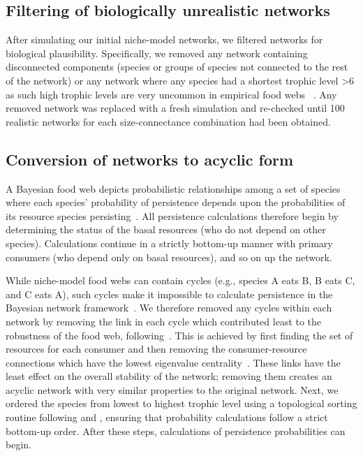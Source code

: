 \documentclass[12pt]{article}
\begin{document}
\begin{spacing}{2.0}
    
    \subsection*{Filtering of biologically unrealistic networks}

        After simulating our initial niche-model networks, we filtered networks for biological plausibility.
        Specifically, we removed any network containing disconnected components
        (species or groups of species not connected to the rest of the network) 
        or any network where any species had a shortest trophic level \textgreater6 as such high trophic levels are very uncommon in empirical food webs ~\citep{Riede2011}.
        Any removed network was replaced with a fresh simulation and re-checked until 100 realistic networks for each size-connectance combination had been obtained.
    

    \subsection*{Conversion of networks to acyclic form}

        A Bayesian food web depicts probabilistic relationships among a set of species where each species' probability of persistence depends upon the probabilities of its resource species persisting~\citep{Jensen_Nielsen,Eklof2013}. 
        All persistence calculations therefore begin by determining the status of the basal resources (who do not depend on other species).
        Calculations continue in a strictly bottom-up manner with primary consumers (who depend only on basal resources), and so on up the network.

            
        While niche-model food webs can contain cycles (e.g., species A eats B, B eats C, and C eats A), such cycles make it impossible to calculate persistence in the Bayesian network framework~\citep{Tarjan1972}. 
        We therefore removed any cycles within each network by removing the link in each cycle which contributed least to the robustness of the food web, following~\citet{Allesina2009functional}.
        This is achieved by first finding the set of resources for each consumer and then removing the consumer-resource connections which have the lowest eigenvalue centrality~\citep{Allesina2009functional}.
        These links have the least effect on the overall stability of the network; removing them creates an acyclic network with very similar properties to the original network.
        Next, we ordered the species from lowest to highest trophic level using a topological sorting routine following \citet{Tarjan1972} and \citet{Allesinaetal2005}, ensuring that probability calculations follow a strict bottom-up order. 
        After these steps, calculations of persistence probabilities can begin.
        


\end{spacing}
\end{document}
